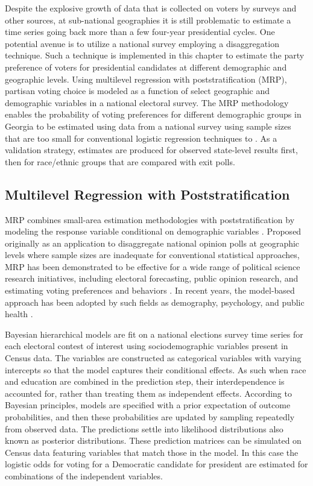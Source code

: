 Despite the explosive growth of data that is collected on voters by surveys and other sources, at sub-national geographies it is still problematic to estimate a time series going back more than a few four-year presidential cycles. One potential avenue is to utilize a national survey employing a disaggregation technique. Such a technique is implemented in this chapter to estimate the party preference of voters for presidential candidates at different demographic and geographic levels. Using multilevel regression with poststratification (MRP), partisan voting choice is modeled as a function of select geographic and demographic variables in a national electoral survey. The MRP methodology enables the probability of voting preferences for different demographic groups in Georgia to be estimated using data from a national survey using sample sizes that are too small for conventional logistic regression techniques to . As a validation strategy, estimates are produced for observed state-level results first, then for race/ethnic groups that are compared with exit polls. 

\subsection{Multilevel Regression with Poststratification}

MRP combines small-area estimation methodologies with poststratification by modeling the response variable conditional on demographic variables \citep{gelman_poststratification_1997}. Proposed originally as an application to disaggregate national opinion polls at geographic levels where sample sizes are inadequate for conventional statistical approaches, MRP has been demonstrated to be effective for a wide range of political science research initiatives, including electoral forecasting, public opinion research, and estimating voting preferences and behaviors \citep{gelman_poststratification_1997, ghitza_deep_2013, gelman_mister_2013, lax_gay_2009, park_bayesian_2004}. In recent years, the model-based approach has been adopted by such fields as demography, psychology, and public health \citep{claassen_improving_2020, wang_using_2018, wang_comparison_2017, zhang_multilevel_2014, kennedy_know_2020}. 

 Bayesian hierarchical models are fit on  a national elections survey time series for each electoral contest of interest using sociodemographic variables present in Census data. The variables are constructed as categorical variables with varying intercepts so that the model captures their conditional effects. As such when race and education are combined in the prediction step, their interdependence is accounted for, rather than treating them as independent effects. According to Bayesian principles, models are specified with a prior expectation of outcome probabilities, and then these probabilities are updated by sampling repeatedly from observed data. The predictions settle into likelihood distributions also known as posterior distributions. These prediction matrices can be simulated on Census data featuring variables that match those in the model. In this case the logistic odds for voting for a Democratic candidate for president are estimated for combinations of the independent variables.

